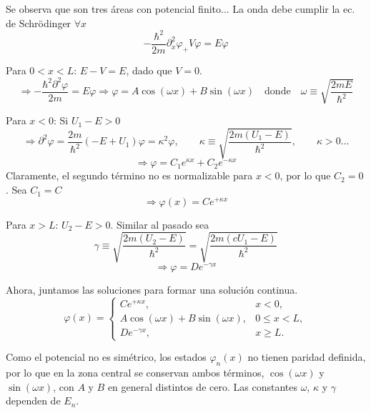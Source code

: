 Se observa que son tres áreas con potencial finito... La onda debe cumplir la ec. de Schrödinger $\forall x$
\begin{equation*}
-\frac{\hbar^2}{2m}\partial^2_x\varphi_ + V\varphi = E\varphi
\end{equation*}

Para $0<x<L$: $E - V = E$, dado que $V=0$.
\begin{equation*}
\Rightarrow -\frac{\hbar^2\partial^2\varphi}{2m} = E\varphi \Rightarrow \varphi = A\cos(\omega x) + B\sin(\omega x) \quad \text{donde} \quad \omega \equiv \sqrt{\frac{2mE}{\hbar^2}}
\end{equation*}

Para $x<0$: Si $U_1 - E > 0$
\begin{equation*}
\Rightarrow \partial^2\varphi = \frac{2m}{\hbar^2}(-E+U_1)\varphi = \kappa^2\varphi, \qquad \kappa \equiv \sqrt{\frac{2m(U_1-E)}{\hbar^2}}, \qquad \kappa > 0 \ldots
\end{equation*}
\begin{equation*}
\Rightarrow \varphi = C_1 e^{\kappa x} + C_2 e^{-\kappa x}
\end{equation*}
Claramente, el segundo término no es normalizable para $x<0$, por lo que $C_2 = 0$. Sea $C_1 = C$
\begin{equation*}
\Rightarrow \varphi(x) = C e^{+\kappa x}
\end{equation*}

Para $x>L$: $U_2 - E > 0$. Similar al pasado sea
\begin{equation*}
\gamma \equiv \sqrt{\frac{2m(U_2-E)}{\hbar^2}} = \sqrt{\frac{2m(cU_1-E)}{\hbar^2}}
\end{equation*}
\begin{equation*}
\Rightarrow \varphi = De^{-\gamma x}
\end{equation*}

Ahora, juntamos las soluciones para formar una solución continua.
\begin{equation}
\varphi(x) = \begin{cases} C e^{+\kappa x}, & x<0, \\ A\cos(\omega x) + B\sin(\omega x), & 0 \leq x < L, \\ De^{-\gamma x}, & x \geq L. \end{cases}
\label{eq: phi cases asim}
\end{equation}

Como el potencial no es simétrico, los estados $\varphi_n(x)$ no tienen paridad definida, por lo que en la zona central se conservan ambos términos, $\cos(\omega x)$ y $\sin(\omega x)$, con $A$ y $B$ en general distintos de cero. Las constantes $\omega$, $\kappa$ y $\gamma$ dependen de $E_n$.


